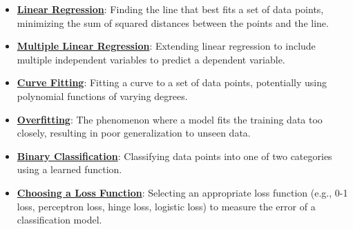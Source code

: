 \documentclass{article}%
\begin{document}
\begin{itemize}[leftmargin=*]%
\item \href{https://purdue.brightspace.com/d2l/common/assets/pdfjs-d2l-dist/1.0.14-legacy/web/viewer.html?file=%2Fcontent%2Fenforced%2F1095467-wl.202510.CS.24300.001%2F05L2-ML Basics.pdf%3Fou%3D1095467&lang=en-us&container=d2l-fileviewer-rendered-pdf&fullscreen=d2l-fileviewer-rendered-pdf-dialog&height=667#page=6}{\textbf{Linear Regression}}: Finding the line that best fits a set of data points, minimizing the sum of squared distances between the points and the line.%
\item \href{https://purdue.brightspace.com/d2l/common/assets/pdfjs-d2l-dist/1.0.14-legacy/web/viewer.html?file=%2Fcontent%2Fenforced%2F1095467-wl.202510.CS.24300.001%2F05L2-ML Basics.pdf%3Fou%3D1095467&lang=en-us&container=d2l-fileviewer-rendered-pdf&fullscreen=d2l-fileviewer-rendered-pdf-dialog&height=667#page=11}{\textbf{Multiple Linear Regression}}: Extending linear regression to include multiple independent variables to predict a dependent variable.%
\item \href{https://purdue.brightspace.com/d2l/common/assets/pdfjs-d2l-dist/1.0.14-legacy/web/viewer.html?file=%2Fcontent%2Fenforced%2F1095467-wl.202510.CS.24300.001%2F05L2-ML Basics.pdf%3Fou%3D1095467&lang=en-us&container=d2l-fileviewer-rendered-pdf&fullscreen=d2l-fileviewer-rendered-pdf-dialog&height=667#page=13}{\textbf{Curve Fitting}}: Fitting a curve to a set of data points, potentially using polynomial functions of varying degrees.%
\item \href{https://purdue.brightspace.com/d2l/common/assets/pdfjs-d2l-dist/1.0.14-legacy/web/viewer.html?file=%2Fcontent%2Fenforced%2F1095467-wl.202510.CS.24300.001%2F05L2-ML Basics.pdf%3Fou%3D1095467&lang=en-us&container=d2l-fileviewer-rendered-pdf&fullscreen=d2l-fileviewer-rendered-pdf-dialog&height=667#page=14}{\textbf{Overfitting}}: The phenomenon where a model fits the training data too closely, resulting in poor generalization to unseen data.%
\item \href{https://purdue.brightspace.com/d2l/common/assets/pdfjs-d2l-dist/1.0.14-legacy/web/viewer.html?file=%2Fcontent%2Fenforced%2F1095467-wl.202510.CS.24300.001%2F05L2-ML Basics.pdf%3Fou%3D1095467&lang=en-us&container=d2l-fileviewer-rendered-pdf&fullscreen=d2l-fileviewer-rendered-pdf-dialog&height=667#page=20}{\textbf{Binary Classification}}: Classifying data points into one of two categories using a learned function.%
\item \href{https://purdue.brightspace.com/d2l/common/assets/pdfjs-d2l-dist/1.0.14-legacy/web/viewer.html?file=%2Fcontent%2Fenforced%2F1095467-wl.202510.CS.24300.001%2F05L2-ML Basics.pdf%3Fou%3D1095467&lang=en-us&container=d2l-fileviewer-rendered-pdf&fullscreen=d2l-fileviewer-rendered-pdf-dialog&height=667#page=25}{\textbf{Choosing a Loss Function}}: Selecting an appropriate loss function (e.g., 0-1 loss, perceptron loss, hinge loss, logistic loss) to measure the error of a classification model.%

\end{itemize}
\end{document}
